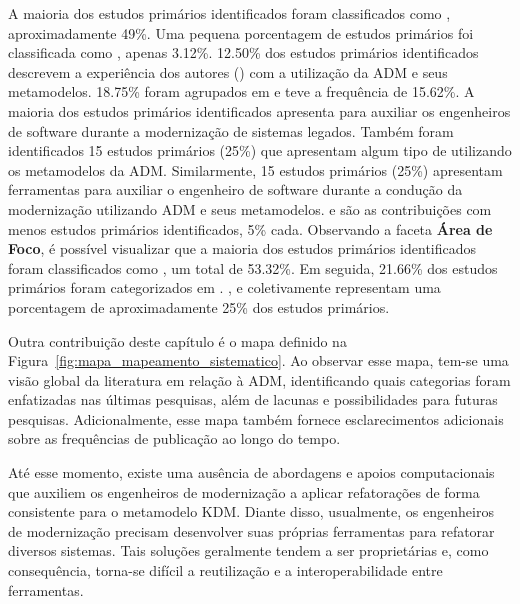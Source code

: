 A maioria dos estudos primários identificados foram classificados como , aproximadamente 49\%. Uma pequena porcentagem de estudos primários foi classificada como , apenas 3.12\%. 12.50\% dos estudos primários identificados descrevem a experiência dos autores () com a utilização da ADM e seus metamodelos. 18.75\% foram agrupados em  e  teve a frequência de 15.62\%. A maioria dos estudos primários identificados apresenta  para auxiliar os engenheiros de software durante a modernização de sistemas legados. Também foram identificados 15 estudos primários (25\%) que apresentam algum tipo de  utilizando os metamodelos da ADM. Similarmente, 15 estudos primários (25\%) apresentam ferramentas para auxiliar o engenheiro de software durante a condução da modernização utilizando ADM e seus metamodelos.  e  são as contribuições com menos estudos primários identificados, 5\% cada. Observando a faceta \textbf{Área de Foco}, é possível visualizar que a maioria dos estudos primários identificados foram classificados como , um total de 53.32\%. Em seguida, 21.66\% dos estudos primários foram categorizados em . ,  e  coletivamente representam uma porcentagem de aproximadamente 25\% dos estudos primários.


Outra contribuição deste capítulo é o mapa definido na Figura~\ref{fig:mapa_mapeamento_sistematico}. Ao observar esse mapa, tem-se uma visão global da literatura em relação à ADM, identificando quais categorias foram enfatizadas nas últimas pesquisas, além de lacunas e possibilidades para futuras pesquisas. Adicionalmente, esse mapa também fornece esclarecimentos adicionais sobre as frequências de publicação ao longo do tempo.



Até esse momento, existe uma ausência de abordagens e apoios computacionais que auxiliem os engenheiros de modernização a aplicar refatorações de forma consistente para o metamodelo KDM. Diante disso, usualmente, os engenheiros de modernização precisam desenvolver suas próprias ferramentas para refatorar diversos sistemas. Tais soluções geralmente tendem a ser proprietárias e, como consequência, torna-se difícil a reutilização e a interoperabilidade entre ferramentas. 

